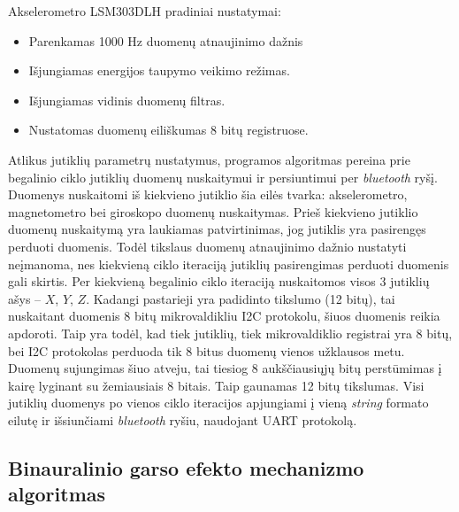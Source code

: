 \documentclass[]{vgtuef}
\begin{document}
{

Akselerometro LSM303DLH pradiniai nustatymai:

\begin{itemize}
\item Parenkamas 1000 Hz duomenų atnaujinimo dažnis
\item Išjungiamas energijos taupymo veikimo režimas.
\item Išjungiamas vidinis duomenų filtras. 
\item Nustatomas duomenų eiliškumas 8 bitų registruose.
\end{itemize}

Atlikus jutiklių parametrų nustatymus, programos algoritmas pereina prie begalinio ciklo jutiklių duomenų nuskaitymui ir persiuntimui per \textit{bluetooth} ryšį. Duomenys nuskaitomi iš kiekvieno jutiklio šia eilės tvarka: akselerometro, magnetometro bei giroskopo duomenų nuskaitymas. Prieš kiekvieno jutiklio duomenų nuskaitymą yra laukiamas patvirtinimas, jog jutiklis yra pasirengęs perduoti duomenis. Todėl tikslaus duomenų atnaujinimo dažnio nustatyti neįmanoma, nes kiekvieną ciklo iteraciją jutiklių pasirengimas perduoti duomenis gali skirtis. Per kiekvieną begalinio ciklo iteraciją nuskaitomos visos 3 jutiklių ašys – $X$, $Y$, $Z$. Kadangi pastarieji yra padidinto tikslumo (12 bitų), tai nuskaitant duomenis 8 bitų mikrovaldikliu I2C protokolu, šiuos duomenis reikia apdoroti. Taip yra todėl, kad tiek jutiklių, tiek mikrovaldiklio registrai yra 8 bitų, bei I2C protokolas perduoda tik 8 bitus duomenų vienos užklausos metu. Duomenų sujungimas šiuo atveju, tai tiesiog 8 aukščiausiųjų bitų perstūmimas į kairę lyginant su žemiausiais 8 bitais. Taip gaunamas 12 bitų tikslumas. Visi jutiklių duomenys po vienos ciklo iteracijos apjungiami į vieną \textit{string} formato eilutę ir išsiunčiami \textit{bluetooth} ryšiu, naudojant UART protokolą.

\subsection{Binauralinio garso efekto mechanizmo algoritmas}

}
\end{document}
